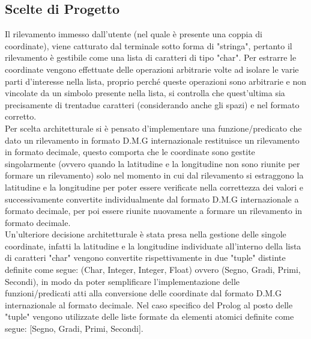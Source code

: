 \documentclass{article}
\begin{document}
\subsection{Scelte di Progetto}
Il rilevamento immesso dall'utente (nel quale è presente una coppia di coordinate), viene catturato dal terminale sotto forma di "stringa", pertanto il rilevamento è gestibile come una lista di caratteri di tipo "char". Per estrarre le coordinate vengono effettuate delle operazioni arbitrarie volte ad isolare le varie parti d'interesse nella lista, proprio perché queste operazioni sono arbitrarie e non vincolate da un simbolo presente nella lista, si controlla che quest'ultima sia precisamente di trentadue caratteri (considerando anche gli spazi) e nel formato corretto.\\
Per scelta architetturale si è pensato d'implementare una funzione/predicato che dato un rilevamento in formato D.M.G internazionale restituisce un rilevamento in formato decimale, questo comporta che le coordinate sono gestite singolarmente (ovvero quando la latitudine e la longitudine non sono riunite per formare un rilevamento) solo nel momento in cui dal rilevamento si estraggono la latitudine e la longitudine per poter essere verificate nella correttezza dei valori e successivamente convertite individualmente dal formato D.M.G internazionale a formato decimale, per poi essere riunite nuovamente a formare un rilevamento in formato decimale.\\
 Un'ulteriore decisione architetturale è stata presa nella gestione delle singole coordinate, infatti la latitudine e la longitudine individuate all'interno della lista di caratteri "char" vengono convertite rispettivamente in due "tuple" distinte definite come segue: (Char, Integer, Integer, Float) ovvero (Segno, Gradi, Primi, Secondi), in modo da poter semplificare l'implementazione delle funzioni/predicati atti alla conversione delle coordinate dal formato D.M.G internazionale al formato decimale. Nel caso specifico del Prolog al posto delle "tuple" vengono utilizzate delle liste formate da elementi atomici definite come segue:  [Segno, Gradi, Primi, Secondi].
 
\end{document}
